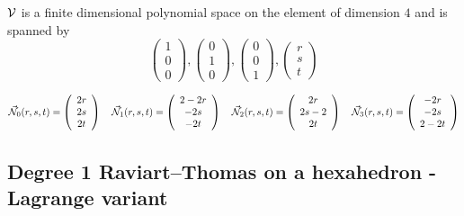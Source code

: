 ${\cal V}$ is a finite dimensional polynomial space on the element of dimension $4$ and is spanned by 
\[
\left( \begin{array}{c} 1 \\ 0 \\ 0  \end{array} \right),
\left( \begin{array}{c} 0 \\ 1 \\ 0  \end{array} \right),
\left( \begin{array}{c} 0 \\ 0 \\ 1 \end{array} \right),
\left( \begin{array}{c} r \\ s \\ t \end{array} \right)
\]


\[
\vec{{\mathcal{N}}}_0(r,s,t) = \left( \begin{array}{c} 2r \\ 2s \\ 2t  \end{array} \right) 
\quad
\vec{{\mathcal{N}}}_1(r,s,t) = \left( \begin{array}{c} 2-2r \\ -2s \\ -2t  \end{array} \right) 
\quad
\vec{{\mathcal{N}}}_2(r,s,t) = \left( \begin{array}{c} 2r \\ 2s-2 \\ 2t  \end{array} \right) 
\quad
\vec{{\mathcal{N}}}_3(r,s,t) = \left( \begin{array}{c} -2r \\ -2s \\ 2-2t  \end{array} \right) 
\]


\subsection{Degree 1 Raviart–Thomas on a hexahedron - Lagrange variant}

